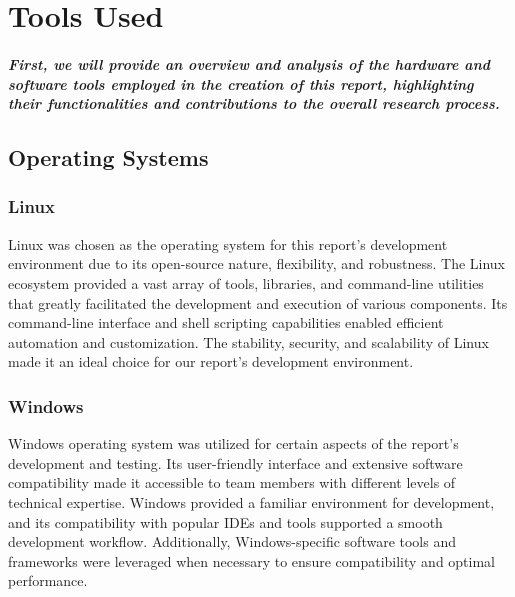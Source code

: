 \chapter{Tools Used}

\paragraph{First, we will provide an overview and analysis of the hardware and software tools employed in the creation of this report, highlighting their functionalities and contributions to the overall research process.}

\section*{Operating Systems}

\vspace{0.5cm}

\subsection*{Linux}

Linux was chosen as the operating system for this report's development environment due to its open-source nature, flexibility, and robustness. The Linux ecosystem provided a vast array of tools, libraries, and command-line utilities that greatly facilitated the development and execution of various components. Its command-line interface and shell scripting capabilities enabled efficient automation and customization. The stability, security, and scalability of Linux made it an ideal choice for our report's development environment.

\vspace{1cm}

\subsection*{Windows}

Windows operating system was utilized for certain aspects of the report's development and testing. Its user-friendly interface and extensive software compatibility made it accessible to team members with different levels of technical expertise. Windows provided a familiar environment for development, and its compatibility with popular IDEs and tools supported a smooth development workflow. Additionally, Windows-specific software tools and frameworks were leveraged when necessary to ensure compatibility and optimal performance.


